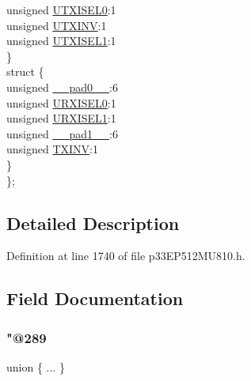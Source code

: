 \begin{DoxyCompactItemize}
\begin{tabbing}
\>\>unsigned \hyperlink{structtag_u2_s_t_a_b_i_t_s_aaff1f97a591df18ff20cf189a2944089}{UTXISEL0}:1\\
\>\>unsigned \hyperlink{structtag_u2_s_t_a_b_i_t_s_a08dde9c5ebe6558bfae4ea659190ddb6}{UTXINV}:1\\
\>\>unsigned \hyperlink{structtag_u2_s_t_a_b_i_t_s_af7ce0d24148cffc8fc3d8abccf37ea9f}{UTXISEL1}:1\\
\>\} \\
\>struct \{\\
\>\>unsigned \hyperlink{structtag_u2_s_t_a_b_i_t_s_adf71f3d8410c1f1dbbc96680a92c49af}{\_\_pad0\_\_}:6\\
\>\>unsigned \hyperlink{structtag_u2_s_t_a_b_i_t_s_af79a21216ad16ee2c61e03f238f42e6a}{URXISEL0}:1\\
\>\>unsigned \hyperlink{structtag_u2_s_t_a_b_i_t_s_a18f8693c16d1aaec33bf9058dc1ea2d2}{URXISEL1}:1\\
\>\>unsigned \hyperlink{structtag_u2_s_t_a_b_i_t_s_acaf2d0924a107ec6e8d2e31febaf66f9}{\_\_pad1\_\_}:6\\
\>\>unsigned \hyperlink{structtag_u2_s_t_a_b_i_t_s_a2baa3dcc3e10cb6a9f3fce197d05376b}{TXINV}:1\\
\>\} \\
\}; \\

\end{tabbing}\end{DoxyCompactItemize}


\subsection{Detailed Description}


Definition at line 1740 of file p33\+E\+P512\+M\+U810.\+h.



\subsection{Field Documentation}
\mbox{\label{structtag_u2_s_t_a_b_i_t_s_abcaaf6f7fcd19b1f8ecb6080b5a42850}} 
\subsubsection{\texorpdfstring{"@289}{@289}}
{\footnotesize\ttfamily union \{ ... \} }

\mbox{\label{structtag_u2_s_t_a_b_i_t_s_adf71f3d8410c1f1dbbc96680a92c49af}} 
